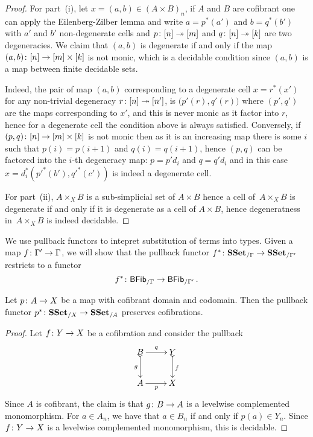 \documentclass[reqno,10pt,a4paper,oneside,draft]{amsart}
\begin{document}
\begin{proof} For part~(i), let $x = (a,b) \in (A \times B)_n$, if $A$ and $B$ are cofibrant one can apply the Eilenberg-Zilber lemma and write $a = p^*(a')$ and $b = q^*(b')$ with $a'$ and $b'$ non-degenerate cells and $p \colon [n] \twoheadrightarrow [m]$ and $q \colon [n] \twoheadrightarrow [k]$ are two degeneracies. We claim that $(a,b)$ is degenerate if and only if the map $(a ,b )  \colon [n] \rightarrow [m] \times [k]$ is not monic, which is a decidable condition since $(a,b)$ is a map between finite decidable sets.

Indeed, the pair of map $(a,b)$ corresponding to a degenerate cell $x=r^*(x')$ for any non-trivial degeneracy $r \colon [n] \twoheadrightarrow [n']$, is  $\big( p'(r),q'(r) \big)$ where $(p',q')$ are the maps corresponding to $x'$, and this is never monic as it factor into $r$, hence for a degenerate cell the condition above is always satisfied. Conversely, if $(p,q)\colon [n] \rightarrow [m] \times [k]$ is not monic then as it is an increasing map there is some $i$ such that $p(i)=p(i+1)$ and $q(i)=q(i+1)$, hence $(p,q)$ can be factored into the $i$-th degeneracy map: $p=p' d_i$ and $q=q' d_i$ and in this case $x= d_i^* (p'^*(b'),q'^*(c'))$ is indeed a degenerate cell.


For part~(ii), $A \times_X B$ is a sub-simplicial set of $A \times B$ hence a cell of~$A \times_X B$ is degenerate if and only if it is degenerate as a cell of $A \times B$, hence degeneratness 
in~$A \times_X B$ is indeed decidable. 
\end{proof}






We use pullback functors to intepret substitution of terms into types. Given a map $f \colon \Gamma' \to \Gamma$, we will show that the pullback functor $f^* \colon \mathbf{SSet}_{/\Gamma} \to \mathbf{SSet}_{/\Gamma'}$ restricts to a functor
\[
f^* \colon \mathsf{BFib}_{/\Gamma}  \to \mathsf{BFib}_{/\Gamma'} \, .
\]





\begin{proposition} \label{thm:cof-pbk}  Let $p \colon A \to X$  be a map with cofibrant domain and codomain.
Then the pullback functor $p^* \colon \mathbf{SSet}_{/X} \to \mathbf{SSet}_{/A}$ preserves cofibrations. 
\end{proposition}

\begin{proof} Let $f \colon Y \to X$ be a cofibration and consider the pullback
\[
\xymatrix{
B \ar[r]^-{q} \ar@{>->}[d]_-{g} &  Y \ar@{>->}[d]^{f} \\
A \ar[r]_{p} & X}
\]
Since $A$ is cofibrant, the claim is that $g \colon B \rightarrow A$ is a levelwise complemented monomorphism. For $a \in A_n$, we have that $a \in B_n$ if and only if $p(a) \in Y_n$. Since $f \colon Y \rightarrow X$ is a levelwise complemented monomorphism, this is decidable.
\end{proof} 
\end{document}
